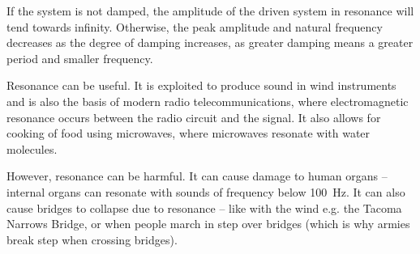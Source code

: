 \documentclass[Physics.tex]{subfiles}
\begin{document}
If the system is not damped, the amplitude of the driven system in resonance will tend towards infinity. Otherwise, the peak amplitude and natural frequency decreases as the degree of damping increases, as greater damping means a greater period and smaller frequency.

Resonance can be useful. It is exploited to produce sound in wind instruments and is also the basis of modern radio telecommunications, where electromagnetic resonance occurs between the radio circuit and the signal. It also allows for cooking of food using microwaves, where microwaves resonate with water molecules.

However, resonance can be harmful. It can cause damage to human organs -- internal organs can resonate with sounds of frequency below \SI{100}{\hertz}. It can also cause bridges to collapse due to resonance -- like with the wind e.g. the Tacoma Narrows Bridge, or when people march in step over bridges (which is why armies break step when crossing bridges).
\end{document}
